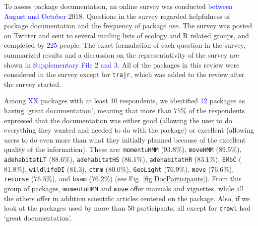 \documentclass[a4paper,12pt]{article}
\newcommand{\Rpkg}[1]{\texttt{#1}}
\begin{document}
To assess package documentation, an online survey was conducted \textcolor{blue}{between August and October} 2018. %
Questions in the survey regarded helpfulness of package documentation and the frequency of package use. 
The survey was posted on Twitter and sent to several mailing lists of ecology and R related groups, and completed by \textcolor{blue}{225} people. The exact formulation of each question in the survey, summarized results and a discussion on the representativity of the survey are shown in \textcolor{blue}{Supplementary File 2 and 3}. %
All of the packages in this review were considered in the survey except for \Rpkg{trajr}, which was added to the review after the survey started. %


Among \textcolor{blue}{XX} packages with at least 10 respondents, we identified \textcolor{blue}{12} packages as having `great documentation', meaning that more than $75\%$ of the respondents expressed that the documentation was either good (allowing the user to do everything they wanted and needed to do with the package) or excellent (allowing users to do even more than what they initially planned because of the excellent quality of the information). These are: \Rpkg{momentuHMM} ($93.8\%$), \Rpkg{moveHMM} ($89.5\%$), \Rpkg{adehabitatLT} ($88.6\%$), \Rpkg{adehabitatHS} ($86.1\%$), \Rpkg{adehabitatHR} ($83.1\%$), \Rpkg{EMbC} ($81.8\%$), \Rpkg{wildlifeDI} ($81.3$), \Rpkg{ctmm} ($80.0\%$), \Rpkg{GeoLight} ($76.9\%$), \Rpkg{move} ($76.6\%$), \Rpkg{recurse} ($76.5\%$), and \Rpkg{bsam} ($76.2\%$) (see Fig. \ref{fig:DocParticipants}). From this group of packages, \Rpkg{momentuHMM} and \Rpkg{move} offer manuals and vignettes, while all the others offer in addition scientific articles centered on the package. Also, if we look at the packages used by more than $50$ participants, all except for \Rpkg{crawl} had `great documentation'. %
\end{document}
